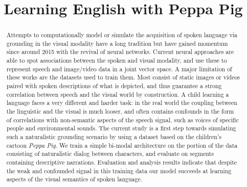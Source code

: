 \documentclass[a4paper]{article}
\begin{document}
\title{Learning English with Peppa Pig}

\author{}
\date{}


\maketitle
\begin{abstract}
  Attempts to computationally model or simulate the acquisition of
  spoken language via grounding in the visual modality have a long
  tradition but have gained momentum since around 2015 with the
  revival of neural networks. Current neural approaches are able to
  spot associations between the spoken and visual modality, and use
  these to represent speech and image/video data in a joint vector
  space. A major limitation of these works are the datasets used to
  train them. Most consist of static images or videos paired with
  spoken descriptions of what is depicted, and thus guarantee a strong
  correlation between speech and the visual world by construction. A
  child learning a language faces a very different and harder task: in
  the real world the coupling between the linguistic and the visual is
  much looser, and often contains confounds in the form of
  correlations with non-semantic aspects of the speech signal, such as
  voices of specific people and environmental sounds. The current
  study is a first step towards simulating such a naturalistic
  grounding scenario by using a dataset based on the children's
  cartoon {\it Peppa Pig}. We train a simple bi-modal architecture on
  the portion of the data consisting of naturalistic dialog between
  characters, and evaluate on segments containing descriptive
  narrations. Evaluation and analysis results indicate that despite
  the weak and confounded signal in this training data our model
  succeeds at learning aspects of the visual semantics of spoken
  language.
\end{abstract}









\end{document}
